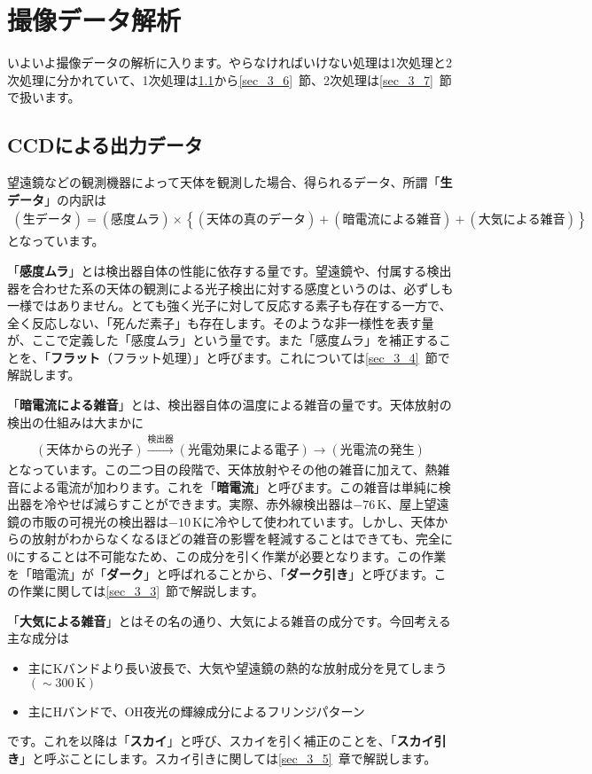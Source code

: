 \chapter{撮像データ解析}
\label{chap_3}
いよいよ撮像データの解析に入ります。やらなければいけない処理は1次処理と2次処理に分かれていて、1次処理は\ref{sec_3_1}から\ref{sec_3_6}~節、2次処理は\ref{sec_3_7}~節で扱います。

\section{CCDによる出力データ}
\label{sec_3_1}
望遠鏡などの観測機器によって天体を観測した場合、得られるデータ、所謂「\textbf{生データ}」の内訳は
\begin{align}
  (\text{生データ}) =  (\text{感度ムラ}) \times \left\{  (\text{天体の真のデータ})+(\text{暗電流による雑音})+(大気による雑音) \right\}\label{eq_3_1}
\end{align}
となっています。

「\textbf{感度ムラ}」とは検出器自体の性能に依存する量です。望遠鏡や、付属する検出器を合わせた系の天体の観測による光子検出に対する感度というのは、必ずしも一様ではありません。とても強く光子に対して反応する素子も存在する一方で、全く反応しない、「死んだ素子」も存在します。そのような非一様性を表す量が、ここで定義した「感度ムラ」という量です。また「感度ムラ」を補正することを、「\textbf{フラット}（フラット処理）」と呼びます。これについては\ref{sec_3_4}~節で解説します。

「\textbf{暗電流による雑音}」とは、検出器自体の温度による雑音の量です。天体放射の検出の仕組みは大まかに
\begin{align*}
  (\text{天体からの光子}) \xrightarrow{\text{検出器}} (\text{光電効果による電子}) \rightarrow (\text{光電流の発生})
\end{align*}
となっています。この二つ目の段階で、天体放射やその他の雑音に加えて、熱雑音による電流が加わります。これを「\textbf{暗電流}」と呼びます。この雑音は単純に検出器を冷やせば減らすことができます。実際、赤外線検出器は$-76\,\mathrm{K}$、屋上望遠鏡の市販の可視光の検出器は$-10\,\mathrm{K}$に冷やして使われています。しかし、天体からの放射がわからなくなるほどの雑音の影響を軽減することはできても、完全に$0$にすることは不可能なため、この成分を引く作業が必要となります。この作業を「暗電流」が「\textbf{ダーク}」と呼ばれることから、「\textbf{ダーク引き}」と呼びます。この作業に関しては\ref{sec_3_3}~節で解説します。

「\textbf{大気による雑音}」とはその名の通り、大気による雑音の成分です。今回考える主な成分は
\begin{itemize}
  \item 主にKバンドより長い波長で、大気や望遠鏡の熱的な放射成分を見てしまう$(\sim300\,\mathrm{K})$
  \item 主にHバンドで、OH夜光の輝線成分によるフリンジパターン
\end{itemize}
です。これを以降は「\textbf{スカイ}」と呼び、スカイを引く補正のことを、「\textbf{スカイ引き}」と呼ぶことにします。スカイ引きに関しては\ref{sec_3_5}~章で解説します。

